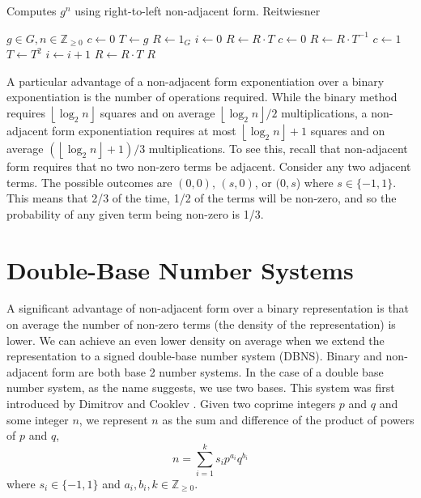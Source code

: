 \documentclass{ucalgthes1}
\theoremstyle{definition}
\newcommand{\ZZgez}{\mathbb{Z}_{\ge 0}}
\newcommand{\floor}[1]{\left\lfloor #1 \right\rfloor}
\begin{document}
\begin{algorithm}[h]
\caption{Computes $g^n$ using right-to-left non-adjacent form. Reitwiesner \cite{reitwiesner1960}}
\label{alg:nafR2LImmutable}
\begin{algorithmic}[1]
\REQUIRE $g \in G, n \in \ZZgez$
\STATE $c \gets 0$ 
\STATE $T \gets g$ 
\STATE $R \gets 1_G$
\STATE $i \gets 0$
	\IF {$\floor{n/2^i}+c \equiv 1 \pmod 4$}
		\STATE $R \gets R \cdot T$
		\STATE $c \gets 0$
	\ELSIF {$\floor{n/2^i}+c \equiv 3 \pmod 4$}
		\STATE $R \gets R \cdot T^{-1}$
		\STATE $c \gets 1$
	\ENDIF
	\STATE $T \gets T^2$
	\STATE $i \gets i+1$
\ENDWHILE
{} \STATE $R \gets R \cdot T$ \ENDIF
\RETURN $R$
\end{algorithmic}
\end{algorithm}

A particular advantage of a non-adjacent form exponentiation over a binary exponentiation is the number of operations required.  While the binary method requires $\floor{\log_2 n}$ squares and on average $\floor{\log_2 n}/2$ multiplications, a non-adjacent form exponentiation requires at most $\floor{\log_2 n}+1$ squares and on average $(\floor{\log_2 n}+1)/3$ multiplications.  To see this, recall that non-adjacent form requires that no two non-zero terms be adjacent.  Consider any two adjacent terms.  The possible outcomes are $(0,0)$, $(s, 0)$, or $(0, s$) where $s \in \{-1, 1\}$. This means that 2/3 of the time, 1/2 of the terms will be non-zero, and so the probability of any given term being non-zero is 1/3.


\bigbreak
\section{Double-Base Number Systems}
\label{section:dbns}

A significant advantage of non-adjacent form over a binary representation is that on average the number of non-zero terms (the density of the representation) is lower.  We can achieve an even lower density on average when we extend the representation to a signed double-base number system (DBNS).  Binary and non-adjacent form are both base 2 number systems.  In the case of a double base number system, as the name suggests, we use two bases.  This system was first introduced by Dimitrov and Cooklev \cite{Dimitrov1995a, Dimitrov1995b}.  Given two coprime integers $p$ and $q$ and some integer $n$, we represent $n$ as the sum and difference of the product of powers of $p$ and $q$,
\begin{equation}\label{eq:generalDbnsForm}
	n = \sum_{i=1}^k s_i p^{a_i} q^{b_i}
\end{equation}
where $s_i \in \{-1, 1\}$ and $a_i, b_i, k \in \ZZgez$.
\end{document}
